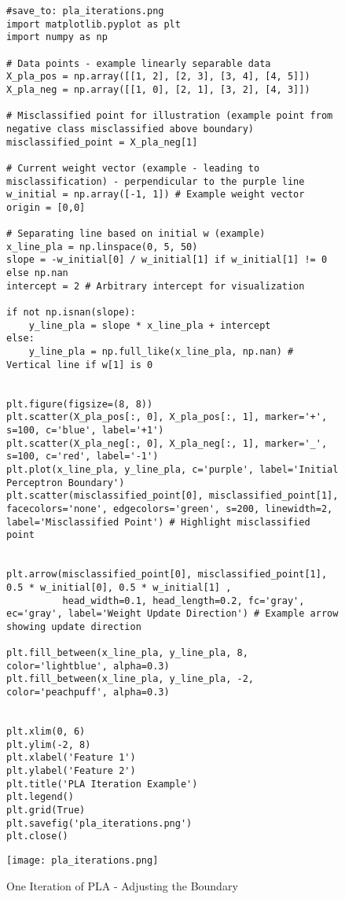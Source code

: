 \documentclass{article}
\begin{document}
\begin{figure}[H]
    \centering
    \begin{verbatim}
#save_to: pla_iterations.png
import matplotlib.pyplot as plt
import numpy as np

# Data points - example linearly separable data
X_pla_pos = np.array([[1, 2], [2, 3], [3, 4], [4, 5]])
X_pla_neg = np.array([[1, 0], [2, 1], [3, 2], [4, 3]])

# Misclassified point for illustration (example point from negative class misclassified above boundary)
misclassified_point = X_pla_neg[1]

# Current weight vector (example - leading to misclassification) - perpendicular to the purple line
w_initial = np.array([-1, 1]) # Example weight vector
origin = [0,0]

# Separating line based on initial w (example)
x_line_pla = np.linspace(0, 5, 50)
slope = -w_initial[0] / w_initial[1] if w_initial[1] != 0 else np.nan
intercept = 2 # Arbitrary intercept for visualization

if not np.isnan(slope):
    y_line_pla = slope * x_line_pla + intercept
else:
    y_line_pla = np.full_like(x_line_pla, np.nan) # Vertical line if w[1] is 0


plt.figure(figsize=(8, 8))
plt.scatter(X_pla_pos[:, 0], X_pla_pos[:, 1], marker='+', s=100, c='blue', label='+1')
plt.scatter(X_pla_neg[:, 0], X_pla_neg[:, 1], marker='_', s=100, c='red', label='-1')
plt.plot(x_line_pla, y_line_pla, c='purple', label='Initial Perceptron Boundary')
plt.scatter(misclassified_point[0], misclassified_point[1], facecolors='none', edgecolors='green', s=200, linewidth=2, label='Misclassified Point') # Highlight misclassified point


plt.arrow(misclassified_point[0], misclassified_point[1], 0.5 * w_initial[0], 0.5 * w_initial[1] ,
          head_width=0.1, head_length=0.2, fc='gray', ec='gray', label='Weight Update Direction') # Example arrow showing update direction

plt.fill_between(x_line_pla, y_line_pla, 8, color='lightblue', alpha=0.3)
plt.fill_between(x_line_pla, y_line_pla, -2, color='peachpuff', alpha=0.3)


plt.xlim(0, 6)
plt.ylim(-2, 8)
plt.xlabel('Feature 1')
plt.ylabel('Feature 2')
plt.title('PLA Iteration Example')
plt.legend()
plt.grid(True)
plt.savefig('pla_iterations.png')
plt.close()
        \end{verbatim}
    \texttt{[image: pla\_iterations.png]}
    \caption{One Iteration of PLA - Adjusting the Boundary}
    \label{fig:pla_iterations}
\end{figure}
\end{document}
